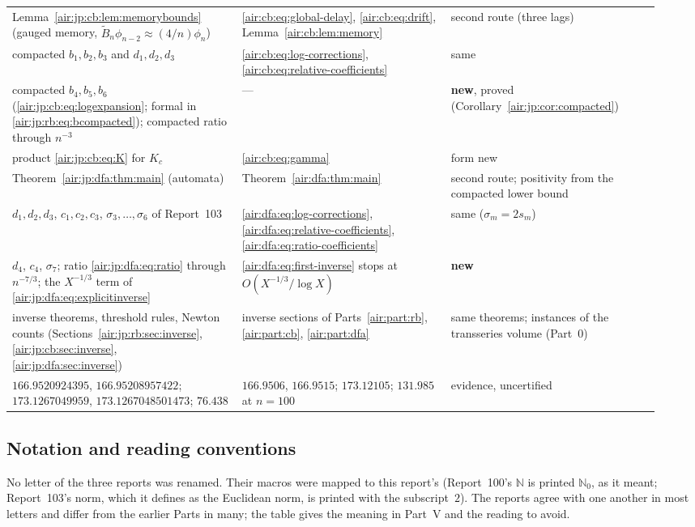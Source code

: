 \documentclass[11pt,letterpaper]{article}
\numberwithin{equation}{section}
\theoremstyle{remark}
\begin{document}
{\begin{longtable}{@{}>{\raggedright\arraybackslash}p{0.33\linewidth}>{\raggedright\arraybackslash}p{0.3\linewidth}>{\raggedright\arraybackslash}p{0.3\linewidth}@{}}
Lemma~\ref{air:jp:cb:lem:memorybounds} (gauged memory, $\widetilde B_n\phi_{n-2}\approx(4/n)\phi_n$) & \eqref{air:cb:eq:global-delay}, \eqref{air:cb:eq:drift}, Lemma~\ref{air:cb:lem:memory} & second route (three lags)\\
compacted $b_1,b_2,b_3$ and $d_1,d_2,d_3$ & \eqref{air:cb:eq:log-corrections}, \eqref{air:cb:eq:relative-coefficients} & same\\
compacted $b_4,b_5,b_6$ (\eqref{air:jp:cb:eq:logexpansion}; formal in \eqref{air:jp:rb:eq:bcompacted}); compacted ratio through $n^{-3}$ & --- & \textbf{new}, proved (Corollary~\ref{air:jp:cor:compacted})\\
product \eqref{air:jp:cb:eq:K} for $K_c$ & \eqref{air:cb:eq:gamma} & form new\\
Theorem~\ref{air:jp:dfa:thm:main} (automata) & Theorem~\ref{air:dfa:thm:main} & second route; positivity from the compacted lower bound\\
$d_1,d_2,d_3$, $c_1,c_2,c_3$, $\sigma_3,\ldots,\sigma_6$ of Report~103 & \eqref{air:dfa:eq:log-corrections}, \eqref{air:dfa:eq:relative-coefficients}, \eqref{air:dfa:eq:ratio-coefficients} & same ($\sigma_m=2s_m$)\\
$d_4$, $c_4$, $\sigma_7$; ratio \eqref{air:jp:dfa:eq:ratio} through $n^{-7/3}$; the $X^{-1/3}$ term of \eqref{air:jp:dfa:eq:explicitinverse} & \eqref{air:dfa:eq:first-inverse} stops at $O(X^{-1/3}/\log X)$ & \textbf{new}\\
inverse theorems, threshold rules, Newton counts (Sections~\ref{air:jp:rb:sec:inverse}, \ref{air:jp:cb:sec:inverse}, \ref{air:jp:dfa:sec:inverse}) & inverse sections of Parts~\ref{air:part:rb}, \ref{air:part:cb}, \ref{air:part:dfa} & same theorems; instances of the transseries volume (Part~0)\\
$166.9520924395$, $166.95208957422$; $173.1267049959$, $173.1267048501473$; $76.438$ & $166.9506$, $166.9515$; $173.12105$; $131.985$ at $n=100$ & evidence, uncertified\\
\end{longtable}
}

\subsection{Notation and reading conventions}\label{air:jp:sec:notation}
No letter of the three reports was renamed. Their macros were mapped to this report's (Report~100's $\mathbb N$ is printed $\mathbb N_0$, as it meant; Report~103's norm, which it defines as the Euclidean norm, is printed with the subscript~$2$). The reports agree with one another in most letters and differ from the earlier Parts in many; the table gives the meaning in Part~V and the reading to avoid.
\end{document}

